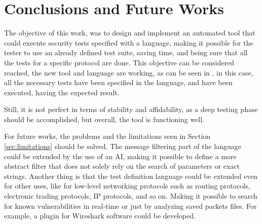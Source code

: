 \chapter{Conclusions and Future Works}
\label{chap:Conclusions}
The objective of this work, was to design and implement an automated tool that could execute security tests specified with a language, making it possible for the tester to use an already defined test suite, saving time, and being sure that all the tests for a specific protocol are done. This objective can be considered reached, the new tool and language are working, as can be seen in \cite{sofia_zanrosso}, in this case, all the necessary tests have been specified in the language, and have been executed, having the expected result. 

Still, it is not perfect in terms of stability and affidability, as a deep testing phase should be accomplished, but overall, the tool is functioning well.

For future works, the problems and the limitations seen in Section \ref{sec:limitations} should be solved. The message filtering part of the language could be extended by the use of an AI, making it possible to define a more abstract filter that does not solely rely on the search of parameters or exact strings. Another thing is that the test definition language could be extended even for other uses, like for low-level networking protocols such as routing protocols, electronic trading protocols, IP protocols, and so on. Making it possible to search for known vulnerabilities in real-time or just by analyzing saved packets files. For example, a plugin for Wireshark software could be developed.
%




